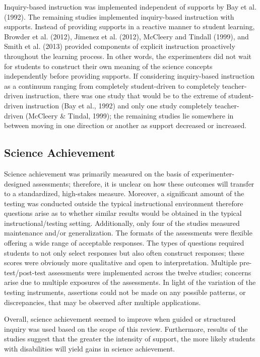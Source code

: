 \documentclass[11.5pt]{sig-alternate} %
\begin{document}
\begin{large}
Inquiry-based instruction was implemented independent of supports by Bay et al. (1992).  The remaining studies implemented inquiry-based instruction with supports.  Instead of providing supports in a reactive manner to student learning, Browder et al. (2012), Jimenez et al. (2012), McCleery and Tindall (1999), and Smith et al. (2013) provided components of explicit instruction proactively throughout the learning process.  In other words, the experimenters did not wait for students to construct their own meaning of the science concepts independently before providing supports.  If considering inquiry-based instruction as a continuum ranging from completely student-driven to completely teacher-driven instruction, there was one study that would be to the extreme of student-driven instruction (Bay et al., 1992) and only one study completely teacher-driven (McCleery \& Tindal, 1999); the remaining studies lie somewhere in between moving in one direction or another as support decreased or increased.  

\subsection*{Science Achievement}

Science achievement was primarily measured on the basis of experimenter-designed assessments; therefore, it is unclear on how these outcomes will transfer to a standardized, high-stakes measure.  Moreover, a significant amount of the testing was conducted outside the typical instructional environment therefore questions arise as to whether similar results would be obtained in the typical instructional/testing setting.  Additionally, only four of the studies measured maintenance and/or generalization.  The formats of the assessments were flexible offering a wide range of acceptable responses.  The types of questions required students to not only select responses but also often construct responses; these scores were obviously more qualitative and open to interpretation.  Multiple pre-test/post-test assessments were implemented across the twelve studies; concerns arise due to multiple exposures of the assessments.   In light of the variation of the testing instruments, assertions could not be made on any possible patterns, or discrepancies, that may be observed after multiple applications. 

Overall, science achievement seemed to improve when guided or structured inquiry was used based on the scope of this review.  Furthermore, results of the studies suggest that the greater the intensity of support, the more likely students with disabilities will yield gains in science achievement.  


\end{large}
\end{document}
